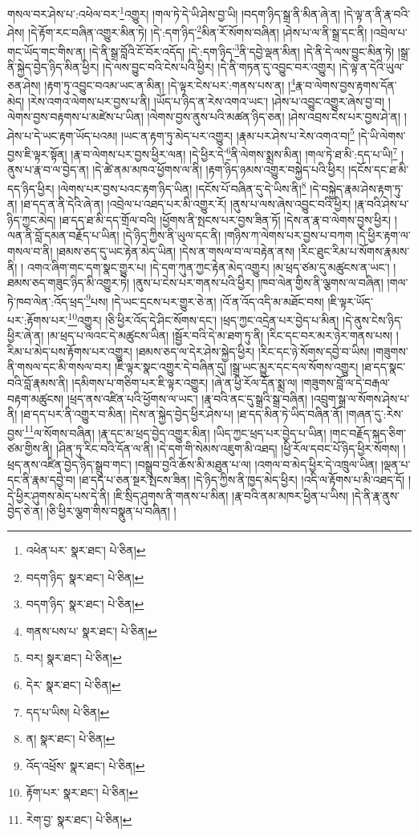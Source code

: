 གསལ་བར་ཤེས་པ་:འཕེལ་བར་\footnote{འཕེན་པར་  སྣར་ཐང་།  པེ་ཅིན། }འགྱུར། །གལ་ཏེ་དེ་ཡི་ཤེས་བྱ་ཡི། །བདག་ཉིད་སྒྲ་ནི་མིན་ཞེ་ན། །དེ་ལྟ་ན་ནི་རྣ་བའི་ཤེས། །དེ་རྟོག་རང་བཞིན་འགྱུར་མིན་ཏེ། །དེ་:དག་ཉིད་\footnote{བདག་ཉིད་  སྣར་ཐང་།  པེ་ཅིན། }མིན་རོ་སོགས་བཞིན། །ཤེས་པ་ལ་ནི་སྒྲ་དང་ནི། །འབྲེལ་པ་གང་ཡོད་གང་གིས་ན། །དེ་ནི་སྒྲ་བློའི་ངོ་བོར་འདོད། །དེ་:དག་ཉིད་\footnote{བདག་ཉིད་  སྣར་ཐང་།  པེ་ཅིན། }ནི་དབྱེ་ལྡན་མིན། །དེ་ནི་དེ་ལས་བྱུང་མིན་ཏེ། །སྒྲ་ནི་སྐྱེད་བྱེད་ཉིད་མིན་ཕྱིར། །དེ་ལས་བྱུང་བའི་ངེས་པའི་ཕྱིར། །དེ་ནི་གཏན་དུ་འབྱུང་བར་འགྱུར། །དེ་ལྟ་ན་དེའི་ཡུལ་ཅན་ཤེས། །རྟག་ཏུ་འབྱུང་བའམ་ཡང་ན་མིན། །དེ་ལྟར་ངེས་པར་:གནས་པས་ན། །\footnote{གནས་པས་པ་  སྣར་ཐང་།  པེ་ཅིན། }རྣ་བ་ལེགས་བྱས་རྟགས་དོན་མེད། །རེས་འགའ་ལེགས་པར་བྱས་པ་ནི། །ཡོད་པ་ཉིད་ན་རེས་འགའ་ཡང་། །ཤེས་པ་འབྱུང་འགྱུར་ཞེས་བྱ་བ། །ལེགས་བྱས་བརྟགས་པ་མཛེས་པ་ཡིན། །ལེགས་བྱས་ནུས་པའི་མཚན་ཉིད་ཅན། །ཤེས་འབྲས་ངེས་པར་བྱས་ཤེ་ན། །ཤེས་པ་དེ་ཡང་རྟག་ཡོད་པའམ། །ཡང་ན་རྟག་ཏུ་མེད་པར་འགྱུར། །རྣམ་པར་ཤེས་པ་རེས་འགའ་བ།\footnote{བར།  སྣར་ཐང་།  པེ་ཅིན། } །དེ་ཡི་ལེགས་བྱས་ཇི་ལྟར་སྟོན། །རྣ་བ་ལེགས་པར་བྱས་ཕྱིར་ལན། །དེ་ཕྱིར་དེ་\footnote{དེར་  སྣར་ཐང་།  པེ་ཅིན། }ནི་ལེགས་སྨྲས་མིན། །གལ་ཏེ་ཐ་མི་:དད་པ་ཡི།\footnote{དད་པ་ཡིས།  པེ་ཅིན། } །ནུས་པ་རྣ་བ་ལ་བྱེད་ན། །དེ་ཚེ་ནམ་མཁའ་ཕྱོགས་ལ་ནི། །རྟག་ཉིད་ཉམས་འགྱུར་བསྐྱེད་པའི་ཕྱིར། །དངོས་དང་ཐ་མི་དད་ཉིད་ཕྱིར། །ལེགས་པར་བྱས་པའང་རྟག་ཉིད་ཡིན། །དངོས་པོ་བཞིན་དུ་དེ་ཡིས་ནི།\footnote{ན།  སྣར་ཐང་།  པེ་ཅིན། } །དེ་བསྐྱེད་རྣམ་ཤེས་རྟག་ཏུ་ན། །ཐ་དད་ན་ནི་དེའི་ཞེ་ན། །འབྲེལ་པ་འཐད་པར་མི་འགྱུར་རོ། །ནུས་པ་ལས་ཞེས་འབྱུང་བའི་ཕྱིར། །རྣ་བའི་ཤེས་པ་ཉིད་ཀྱང་མེད། །ཐ་དད་ཐ་མི་དད་གྲོལ་བའི། །ཕྱོགས་ནི་སྤངས་པར་བྱས་ཟིན་ཏོ། །དེས་ན་རྣ་བ་ལེགས་བྱས་ཕྱིར། །ལན་ནི་བློ་དམན་བརྗོད་པ་ཡིན། །དེ་ཉིད་ཀྱིས་ནི་ཡུལ་དང་ནི། །གཉིས་ཀ་ལེགས་པར་བྱས་པ་བཀག །དེ་ཕྱིར་རྟག་ལ་གསལ་བ་ནི། །ཐམས་ཅད་དུ་ཡང་རྟེན་མེད་ཡིན། །དེས་ན་གསལ་བ་ལ་བརྟེན་ནས། །རིང་ཐུང་རིམ་པ་སོགས་རྣམས་ནི། །
འགའ་ཞིག་གང་དག་སྣང་གྱུར་པ། །དེ་དག་ཀུན་ཀྱང་རྟེན་མེད་འགྱུར། །མ་ཕྲད་ཙམ་དུ་མཚུངས་ན་ཡང་། །ཐམས་ཅད་གཟུང་ཉིད་མི་འགྱུར་ཏེ། །ནུས་པ་ངེས་པར་གནས་པའི་ཕྱིར། །ཁབ་ལེན་གྱིས་ནི་ལྕགས་ལ་བཞིན། །གལ་ཏེ་ཁབ་ལེན་:འོད་ཕྲད་\footnote{འོད་འཕྲོས་  སྣར་ཐང་།  པེ་ཅིན། }པས། །དེ་ཡང་དྲངས་པར་གྱུར་ཅེ་ན། །འོ་ན་འོད་འདི་མ་མཐོང་བས། །ཇི་ལྟར་ཡོད་པར་:རྟོགས་པར་\footnote{རྟོག་པར་  སྣར་ཐང་།  པེ་ཅིན། }འགྱུར། །ཅི་ཕྱིར་འོད་དེ་ཤིང་སོགས་དང་། །ཕྲད་ཀྱང་འདྲེན་པར་བྱེད་པ་མིན། །དེ་ནུས་ངེས་ཉིད་ཕྱིར་ཞེ་ན། །མ་ཕྲད་པ་ལའང་དེ་མཚུངས་ཡིན། །སྦྱོར་བའི་དེ་མ་ཐག་ཏུ་ནི། །རིང་དང་བར་མར་ཉེར་གནས་པས། །རིམ་པ་མེད་པས་རྟོགས་པར་འགྱུར། །ཐམས་ཅད་ལ་དེར་ཤེས་སྐྱེད་ཕྱིར། །རིང་དང་ཉེ་སོགས་དབྱེ་བ་ཡིས། །གཟུགས་ནི་གསལ་དང་མི་གསལ་བར། །ཇི་ལྟར་སྣང་འགྱུར་དེ་བཞིན་དུ། །སྒྲ་ཡང་མྱུར་དང་དལ་སོགས་འགྱུར། །ཐ་དད་སྣང་བའི་བློ་རྣམས་ནི། །དམིགས་པ་གཅིག་པར་ཇི་ལྟར་འགྱུར། །ཞེ་ན་ཕྱི་རོལ་དོན་སྨྲ་ལ། །གཟུགས་བློ་ལ་དེ་བརྒལ་བརྟག་མཚུངས། །ཕྲད་ནས་འཛིན་པའི་ཕྱོགས་ལ་ཡང་། །རྣ་བའི་ནང་དུ་སྒྲའི་སྒྲ་བཞིན། །འབྲུག་སྒྲ་ལ་སོགས་ཤེས་པ་ནི། །ཐ་དད་པར་ནི་འགྱུར་བ་མིན། །དེས་ན་སྐྱེད་བྱེད་ཕྱིར་ཤེས་པ། །ཐ་དད་མིན་ཏེ་ཡིད་བཞིན་ནོ། །གཞན་དུ་:རེས་བྱས་\footnote{རེག་བྱ་  སྣར་ཐང་།  པེ་ཅིན། }ལ་སོགས་བཞིན། །རྣ་དང་མ་ཕྲད་བྱེད་འགྱུར་མིན། །ཡིད་ཀྱང་ཕྲད་པར་བྱེད་པ་ཡིན། །གང་བརྗོད་སྐད་ཅིག་ཙམ་གྱིས་ནི། །ཤིན་ཏུ་རིང་བའི་དོན་ལ་ནི། །དེ་དག་གི་སེམས་འཇུག་མི་འཐད། །ཕྱི་རོལ་དབང་པོ་ཉིད་ཕྱིར་སོགས། །ཕྲད་ནས་འཛིན་བྱེད་ཉིད་སྒྲུབ་གང་། །བསྒྲུབ་བྱའི་ཆོས་མི་མཐུན་པ་ལ། །འགལ་བ་མེད་ཕྱིར་དེ་འཁྲུལ་ཡིན། །ལྡན་པ་དང་ནི་རྣམ་དབྱེ་བ། །ཐ་དད་པ་ཅན་སྔར་སྤངས་ཟིན། །དེ་ཉིད་ཀྱིས་ནི་ཁྱད་མེད་ཕྱིར། །འདི་ལ་རྟོགས་པ་མི་འཐད་དོ། །དེ་ཕྱིར་ཤུགས་མེད་པས་དེ་ནི། །ཇི་སྲིད་ཤུགས་ནི་གནས་པ་མིན། །རྣ་བའི་ནམ་མཁར་ཕྱིན་པ་ཡིས། །དེ་ནི་རྣ་ནུས་བྱེད་ཅེ་ན། །ཅི་ཕྱིར་ལྕག་གིས་བསྣུན་པ་བཞིན། །
